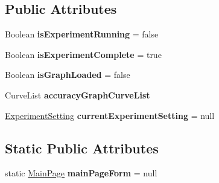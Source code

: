 \subsection*{Public Attributes}
\begin{DoxyCompactItemize}
\item 
\hypertarget{class_acrive_crowd_g_u_i_1_1_main_page_a530697499f4461d556acd087cbb48ae3}{}Boolean {\bfseries is\+Experiment\+Running} = false\label{class_acrive_crowd_g_u_i_1_1_main_page_a530697499f4461d556acd087cbb48ae3}

\item 
\hypertarget{class_acrive_crowd_g_u_i_1_1_main_page_adfae2405ffdf8ad13a4c0a5575d15582}{}Boolean {\bfseries is\+Experiment\+Complete} = true\label{class_acrive_crowd_g_u_i_1_1_main_page_adfae2405ffdf8ad13a4c0a5575d15582}

\item 
\hypertarget{class_acrive_crowd_g_u_i_1_1_main_page_ab4920c84bf5c6056a7aa144c2ad74f25}{}Boolean {\bfseries is\+Graph\+Loaded} = false\label{class_acrive_crowd_g_u_i_1_1_main_page_ab4920c84bf5c6056a7aa144c2ad74f25}

\item 
\hypertarget{class_acrive_crowd_g_u_i_1_1_main_page_a67b45fc1b4677cd59863ff54252036b9}{}Curve\+List {\bfseries accuracy\+Graph\+Curve\+List}\label{class_acrive_crowd_g_u_i_1_1_main_page_a67b45fc1b4677cd59863ff54252036b9}

\item 
\hypertarget{class_acrive_crowd_g_u_i_1_1_main_page_a3eae4f60cc47349006d8488092387964}{}\hyperlink{class_acrive_crowd_g_u_i_1_1_experiment_setting}{Experiment\+Setting} {\bfseries current\+Experiment\+Setting} = null\label{class_acrive_crowd_g_u_i_1_1_main_page_a3eae4f60cc47349006d8488092387964}

\end{DoxyCompactItemize}
\subsection*{Static Public Attributes}
\begin{DoxyCompactItemize}
\item 
\hypertarget{class_acrive_crowd_g_u_i_1_1_main_page_acb85d8a768a11206f1af2f546704b2e2}{}static \hyperlink{class_acrive_crowd_g_u_i_1_1_main_page}{Main\+Page} {\bfseries main\+Page\+Form} = null\label{class_acrive_crowd_g_u_i_1_1_main_page_acb85d8a768a11206f1af2f546704b2e2}

\end{DoxyCompactItemize}
